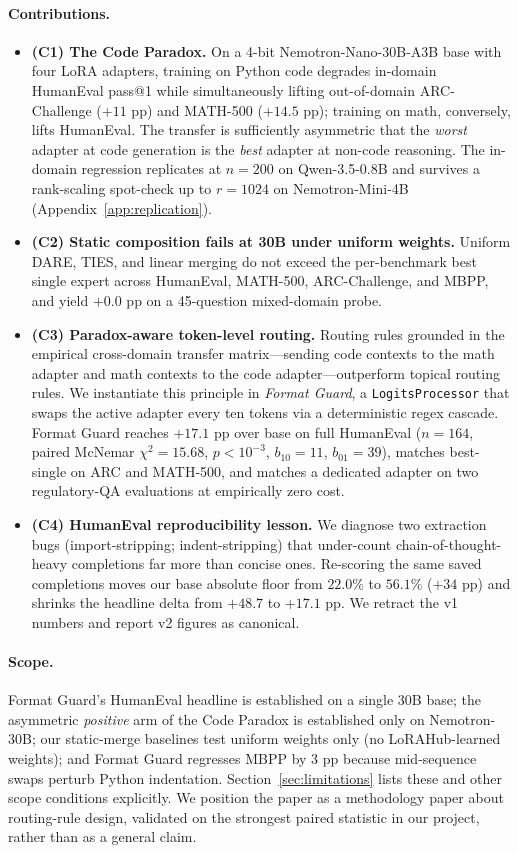 \documentclass{article}
\begin{document}
\paragraph{Contributions.}
\begin{itemize}
\setlength{\itemsep}{2pt}
  \item \textbf{(C1) The Code Paradox.} On a 4-bit Nemotron-Nano-30B-A3B base with four LoRA adapters, training on Python code degrades in-domain HumanEval pass@1 while simultaneously lifting out-of-domain ARC-Challenge ($+11$ pp) and MATH-500 ($+14.5$ pp); training on math, conversely, lifts HumanEval. The transfer is sufficiently asymmetric that the \emph{worst} adapter at code generation is the \emph{best} adapter at non-code reasoning. The in-domain regression replicates at $n=200$ on Qwen-3.5-0.8B and survives a rank-scaling spot-check up to $r=1024$ on Nemotron-Mini-4B (Appendix~\ref{app:replication}).
  \item \textbf{(C2) Static composition fails at 30B under uniform weights.} Uniform DARE, TIES, and linear merging do not exceed the per-benchmark best single expert across HumanEval, MATH-500, ARC-Challenge, and MBPP, and yield $+0.0$ pp on a 45-question mixed-domain probe.
  \item \textbf{(C3) Paradox-aware token-level routing.} Routing rules grounded in the empirical cross-domain transfer matrix---sending code contexts to the math adapter and math contexts to the code adapter---outperform topical routing rules. We instantiate this principle in \emph{Format Guard}, a \texttt{LogitsProcessor} that swaps the active adapter every ten tokens via a deterministic regex cascade. Format Guard reaches $+17.1$ pp over base on full HumanEval ($n=164$, paired McNemar $\chi^2 = 15.68$, $p < 10^{-3}$, $b_{10}{=}11$, $b_{01}{=}39$), matches best-single on ARC and MATH-500, and matches a dedicated adapter on two regulatory-QA evaluations at empirically zero cost.
  \item \textbf{(C4) HumanEval reproducibility lesson.} We diagnose two extraction bugs (import-stripping; indent-stripping) that under-count chain-of-thought-heavy completions far more than concise ones. Re-scoring the same saved completions moves our base absolute floor from $22.0\%$ to $56.1\%$ ($+34$ pp) and shrinks the headline delta from $+48.7$ to $+17.1$ pp. We retract the v1 numbers and report v2 figures as canonical.
\end{itemize}

\paragraph{Scope.} Format Guard's HumanEval headline is established on a single 30B base; the asymmetric \emph{positive} arm of the Code Paradox is established only on Nemotron-30B; our static-merge baselines test uniform weights only (no LoRAHub-learned weights); and Format Guard regresses MBPP by 3 pp because mid-sequence swaps perturb Python indentation. Section~\ref{sec:limitations} lists these and other scope conditions explicitly. We position the paper as a methodology paper about routing-rule design, validated on the strongest paired statistic in our project, rather than as a general claim.
\end{document}
